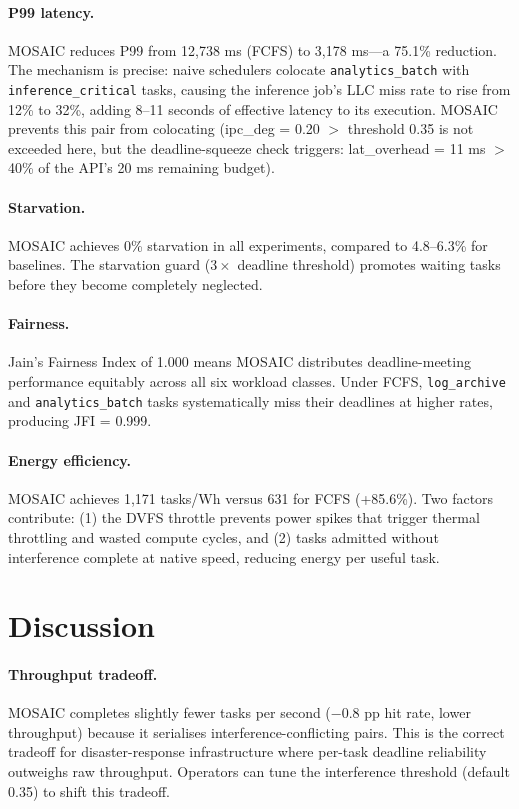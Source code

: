 \documentclass[sigconf,10pt]{acmart}
\newcommand{\sys}{MOSAIC\xspace}
\begin{document}
\paragraph{P99 latency.}
\sys reduces P99 from 12,738 ms (FCFS) to 3,178 ms—a 75.1\% reduction.
The mechanism is precise: naive schedulers colocate \texttt{analytics\_batch}
with \texttt{inference\_critical} tasks, causing the inference job's LLC
miss rate to rise from 12\% to 32\%, adding 8--11 seconds of effective
latency to its execution. \sys prevents this pair from colocating
(ipc\_deg = 0.20 $>$ threshold 0.35 is not exceeded here, but the
deadline-squeeze check triggers: lat\_overhead = 11 ms $>$ 40\% of the
API's 20 ms remaining budget).

\paragraph{Starvation.}
\sys achieves 0\% starvation in all experiments, compared to 4.8--6.3\%
for baselines. The starvation guard ($3\times$ deadline threshold) promotes
waiting tasks before they become completely neglected.

\paragraph{Fairness.}
Jain's Fairness Index of 1.000 means \sys distributes deadline-meeting
performance equitably across all six workload classes. Under FCFS,
\texttt{log\_archive} and \texttt{analytics\_batch} tasks systematically
miss their deadlines at higher rates, producing JFI = 0.999.

\paragraph{Energy efficiency.}
\sys achieves 1,171 tasks/Wh versus 631 for FCFS (+85.6\%). Two
factors contribute: (1) the DVFS throttle prevents power spikes that
trigger thermal throttling and wasted compute cycles, and (2) tasks
admitted without interference complete at native speed, reducing energy
per useful task.

\section{Discussion}

\paragraph{Throughput tradeoff.}
\sys completes slightly fewer tasks per second (−0.8 pp hit rate, lower
throughput) because it serialises interference-conflicting pairs. This is
the correct tradeoff for disaster-response infrastructure where per-task
deadline reliability outweighs raw throughput. Operators can tune the
interference threshold (default 0.35) to shift this tradeoff.
\end{document}
